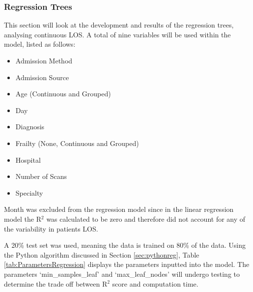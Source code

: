 \documentclass[../thesis.tex]{subfiles}
\begin{document}
\subsubsection{Regression Trees}\label{sec:regressiontrees}
This section will look at the development and results of the regression trees, analysing continuous LOS. A total of nine variables will be used within the model, listed as follows:
\begin{multicols}{2}
\begin{itemize}
    \item Admission Method
    \item Admission Source
    \item Age (Continuous and Grouped)
    \item Day
    \item Diagnosis
    \item Frailty (None, Continuous and Grouped)
    \item Hospital
    \item Number of Scans
    \item Specialty
\end{itemize}
\end{multicols}

Month was excluded from the regression model since in the linear regression model the R$^{2}$ was calculated to be zero and therefore did not account for any of the variability in patients LOS.

A 20\% test set was used, meaning the data is trained on 80\% of the data. Using the Python algorithm discussed in Section \ref{sec:pythonreg}, Table \ref{tab:ParametersRegression} displays the parameters inputted into the model. The parameters `min\_samples\_leaf' and `max\_leaf\_nodes' will undergo testing to determine the trade off between R$^{2}$ score and computation time.

\begin{table}[h!]
    \centering{}
    \caption{The parameters used within the regression tree model using the `DecisionTreeRegressor' algorithm within Python.}
    \label{tab:ParametersRegression}
\end{table}
\end{document}
